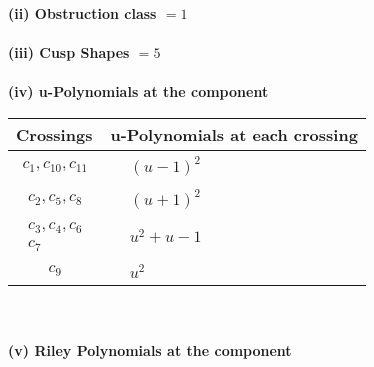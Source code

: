 \documentclass[1p]{elsarticle_modified}
\theoremstyle{definition}
\begin{document}
\flushleft \textbf{(ii) Obstruction class $= 1$}\\~\\
\flushleft \textbf{(iii) Cusp Shapes $= 5$}\\~\\
\newpage\renewcommand{\arraystretch}{1}
\flushleft \textbf{(iv) u-Polynomials at the component}\newline \\
\begin{tabular}{m{50pt}|m{274pt}}
Crossings & \hspace{64pt}u-Polynomials at each crossing \\
\hline $$\begin{aligned}c_{1},c_{10},c_{11}\end{aligned}$$&$\begin{aligned}
&(u-1)^2
\end{aligned}$\\
\hline $$\begin{aligned}c_{2},c_{5},c_{8}\end{aligned}$$&$\begin{aligned}
&(u+1)^2
\end{aligned}$\\
\hline $$\begin{aligned}c_{3},c_{4},c_{6}\\c_{7}\end{aligned}$$&$\begin{aligned}
&u^2+u-1
\end{aligned}$\\
\hline $$\begin{aligned}c_{9}\end{aligned}$$&$\begin{aligned}
&u^2
\end{aligned}$\\
\hline
\end{tabular}\\~\\
\newpage\renewcommand{\arraystretch}{1}
\flushleft \textbf{(v) Riley Polynomials at the component}\newline \\
\end{document}
